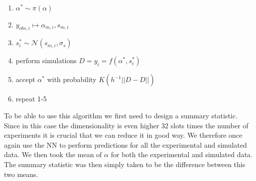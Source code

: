 \documentclass[11pt,a4paper]{article}
\begin{document}
\begin{enumerate}
    \item $\alpha^* \sim \pi(\alpha)$
    \item $y_{obs,i} \mapsto \alpha_{m,i}, s_{m,i}$
    \item $s_i^* \sim \mathcal{N}(s_{m,i}, \sigma_s)$
    \item perform simulations $D = y_i = f(\alpha^*, s_i^*)$
    \item accept $\alpha^*$ with probability $K(h^{-1}||D - \hat{D}||)$
    \item repeat 1-5
\end{enumerate}
To be able to use this algorithm we first need to design a summary statistic. Since in this case the dimensionality is even higher 32 slots times the number of experiments it is crucial that we can reduce it in good way. We therefore once again use the NN to perform predictions for all the experimental and simulated data. We then took the mean of $\alpha$ for both the experimental and simulated data. The summary statistic was then simply taken to be the difference between this two means.




\end{document}
